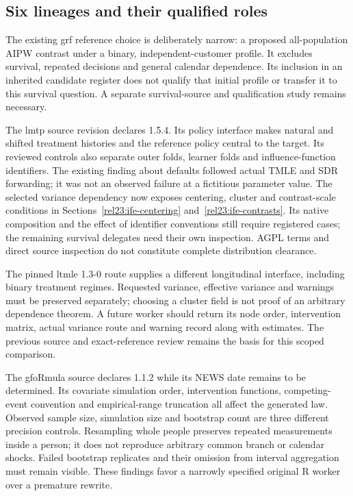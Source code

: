 \subsection{Six lineages and their qualified roles}
The existing grf reference choice is deliberately narrow: a proposed
all-population AIPW contrast under a binary, independent-customer profile.
It excludes survival, repeated decisions and general calendar dependence.
Its inclusion in an inherited candidate register does not qualify that
initial profile or transfer it to this survival question. A separate
survival-source and qualification study remains necessary. \citep{exec21_grf_reuse}

The lmtp source revision declares 1.5.4. Its policy interface makes natural
and shifted treatment histories and the reference policy central to the
target. Its reviewed controls also separate outer folds, learner folds and
influence-function identifiers. The existing finding about defaults followed
actual TMLE and SDR forwarding; it was not an observed failure at a fictitious
parameter value. The selected variance dependency now exposes centering,
cluster and contrast-scale conditions in Sections~\ref{rel23:ife-centering}
and~\ref{rel23:ife-contrasts}. Its native composition and the effect of
identifier conventions still require registered cases; the remaining survival
delegates need their own inspection. AGPL terms and direct source inspection do not
constitute complete distribution clearance. \citep{exec22_lmtp_reuse}

The pinned ltmle 1.3-0 route supplies a different longitudinal interface,
including binary treatment regimes. Requested variance, effective variance
and warnings must be preserved separately; choosing a cluster field is not
proof of an arbitrary dependence theorem. A future worker should return its
node order, intervention matrix, actual variance route and warning record
along with estimates. The previous source and exact-reference review remains
the basis for this scoped comparison. \citep{exec23_ltmle_source,exec23_ltmle_exact}

The gfoRmula source declares 1.1.2 while its NEWS date remains to be determined.
Its covariate simulation order, intervention functions, competing-event
convention and empirical-range truncation all affect the generated law.
Observed sample size, simulation size and bootstrap count are three different
precision controls. Resampling whole people preserves repeated measurements
inside a person; it does not reproduce arbitrary common branch or calendar
shocks. Failed bootstrap replicates and their omission from interval
aggregation must remain visible. These findings favor a narrowly specified
original R worker over a premature rewrite. \citep{exec20_gformula_reuse,exec20_gformula_reference}

